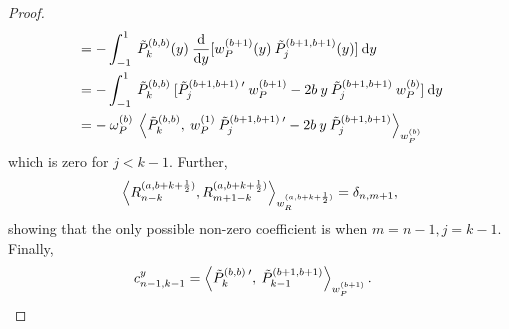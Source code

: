 \documentclass[11pt, oneside]{article}   	%
\newcommand{\half}{\frac{1}{2}}
\newcommand{\ddy}{\frac{\mathrm{d}}{\mathrm{d}y}}
\newcommand{\jac}{{\tilde P}}
\newcommand{\genjac}{R}
\newcommand{\genjacnmk}{\genjac_{n-k}}
\newcommand{\genjacw}{w_\genjac}
\newcommand{\jacw}{w_P}
\newcommand{\normjac}{\omega_P}
\begin{document}
\begin{proof}
\begin{align*}
	&= - \int_{-1}^1 \: \jac_k^{(b,b)}(y) \: \ddy [\jacw^{(b+1)}(y) \: \jac_{j}^{(b+1,b+1)}(y)] \: \D y \\
	&= - \int_{-1}^1 \: \jac_k^{(b,b)} \: [ \jac_{j}^{(b+1,b+1) \: \prime} \: \jacw^{(b+1)} - 2 b \: y \: \jac_{j}^{(b+1,b+1)} \:\jacw^{(b)} ] \: \D y \\
	&= - \: \normjac^{(b)} \: \ip< \jac_k^{(b,b)}, \: \jacw^{(1)} \: \jac_{j}^{(b+1,b+1) \: \prime} -2b \:y \: \jac_{j}^{(b+1,b+1)} >_{\jacw^{(b)}}
\end{align*}
which is zero for $j < k-1$. Further,
\begin{align*}
	\ip< \genjacnmk^{(a,b+k+\half)}, \genjac_{m+1-k}^{(a,b+k+\half)} >_{\genjacw^{(a,b+k+\half)}} = \delta_{n,m+1},
\end{align*}
showing that the only possible non-zero coefficient is when $m=n-1, j=k-1$. Finally,
\begin{align*}
	c_{n-1,k-1}^y &= \ip< \jac_k^{(b,b) \: \prime}, \: \jac_{k-1}^{(b+1,b+1)} >_{\jacw^{(b+1)}}.
\end{align*}


\end{proof}
\end{document}
